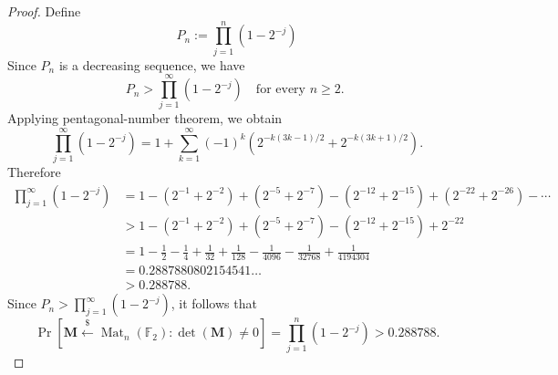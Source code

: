 \documentclass{article}
\theoremstyle{definition}
\newcommand{\F}{\mathbb{F}}
\newcommand{\Mat}{\operatorname{Mat}}
\begin{document}
\begin{proof}
Define
\[
P_n:=\prod_{j=1}^n(1-2^{-j})
\]
Since $P_n$ is a decreasing sequence, we have \[
P_n>\prod_{j=1}^\infty(1-2^{-j})\quad\text{for every $n\ge 2$. }
\] Applying pentagonal-number theorem, we obtain
\[
\prod_{j=1}^\infty(1-2^{-j})=
1+\sum_{k=1}^\infty (-1)^k\left(2^{-k(3k-1)/2}+2^{-k(3k+1)/2}\right).
\]
Therefore \begin{align*}
\prod_{j=1}^\infty(1-2^{-j})
&=
1-\left(2^{-1}+2^{-2}\right)
+\left(2^{-5}+2^{-7}\right)
-\left(2^{-12}+2^{-15}\right)
+\left(2^{-22}+2^{-26}\right)-\cdots\\
&>
1-\left(2^{-1}+2^{-2}\right)
+\left(2^{-5}+2^{-7}\right)
-\left(2^{-12}+2^{-15}\right)
+2^{-22}\\
&=1-\frac12-\frac14+\frac1{32}+\frac1{128}-\frac1{4096}-\frac1{32768}+\frac1{4194304}\\
&=0.2887880802154541\ldots \\
&> 0.288788.
\end{align*}
Since \(P_n>\prod_{j=1}^\infty(1-2^{-j})\), it follows that
\[
\Pr[\mathbf M\xleftarrow{\$}\Mat_n(\F_2):\det(\mathbf M)\neq 0]
=\prod_{j=1}^n(1-2^{-j})
>0.288788.
\]
\end{proof}

\medskip
\end{document}
